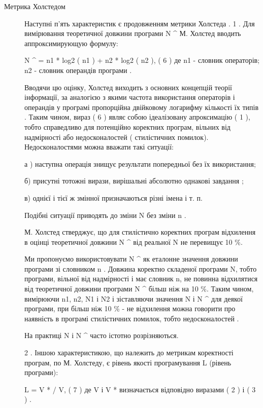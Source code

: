 \begin{description}
\item[{Метрика Холстедом}] \leavevmode
Наступні п'ять характеристик є продовженням метрики Холстеда .
1 . Для вимірювання теоретичної довжини програми N \textasciicircum{} М. Холстед вводить аппроксимирующую формулу:

N \textasciicircum{} = n1 * log2 ( n1 ) + n2 * log2 ( n2 ), ( 6 )
де n1 - словник операторів; n2 - словник операндів програми .

Вводячи цю оцінку, Холстед виходить з основних концепцій теорії інформації, за аналогією з якими частота використання операторів і операндів у програмі пропорційна двійковому логарифму кількості їх типів . Таким чином, вираз ( 6 ) являє собою ідеалізовану апроксимацію ( 1 ), тобто справедливо для потенційно коректних програм, вільних від надмірності або недосконалостей ( стилістичних помилок). Недосконалостями можна вважати такі ситуації:

а ) наступна операція знищує результати попередньої без їх використання;

б) присутні тотожні вирази, вирішальні абсолютно однакові завдання ;

в) однієї і тієї ж змінної призначаються різні імена і т. п.

Подібні ситуації приводять до зміни N без зміни n .

М. Холстед стверджує, що для стилістично коректних програм відхилення в оцінці теоретичної довжини N \textasciicircum{} від реальної N не перевищує 10 \%.

Ми пропонуємо використовувати N \textasciicircum{} як еталонне значення довжини програми зі словником n . Довжина коректно складеної програми N, тобто програми, вільної від надмірності і має словник n, не повинна відхилятися від теоретичної довжини програми N \textasciicircum{} більш ніж на 10 \%. Таким чином, вимірюючи n1, n2, N1 і N2 і зіставляючи значення N і N \textasciicircum{} для деякої програми, при більш ніж 10 \% - не відхилення можна говорити про наявність в програмі стилістичних помилок, тобто недосконалостей .

На практиці N і N \textasciicircum{} часто істотно розрізняються.

2 . Іншою характеристикою, що належить до метрикам коректності програм, по М. Холстеду, є рівень якості програмування L (рівень програми):

L = V * / V, ( 7 )
де V і V * визначається відповідно виразами ( 2 ) і ( 3 ) .


\end{description}
